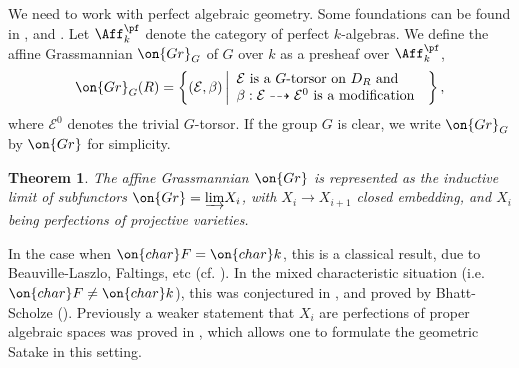\documentclass[11pt]{amsart}
\newtheorem{thm}{Theorem}[subsection]
\theoremstyle{definition}
\theoremstyle{definition}
\theoremstyle{definition}
\numberwithin{equation}{subsection}
\newcommand{\mE}{{\mathcal E}}
\newcommand{\cha}{{\on{char}}}
\newcommand{\Gr}{{\on{Gr}}}
\begin{document}
We need to work with perfect algebraic geometry. Some foundations can be found in \cite[Appendix A]{Zh1}, \cite{BS} and \cite[\S A.1]{XZ}.
Let $\Aff_k^\pf$ denote the category of perfect $k$-algebras. We define the affine Grassmannian $\Gr_G$ of $G$ over $k$ as a presheaf over $\Aff_k^\pf$,
\begin{equation}
\label{E:affGrass def}
\Gr_G(R)= \left\{(\mE,\beta)\left | \begin{array}{l}\mE \mbox{ is a } G\mbox{-torsor on } D_R\textrm{ and }  \\
 \beta: \mE\dashrightarrow \mE^0 \mbox{ is a modification }\end{array}\right.\right\},
\end{equation}
where $\mE^0$ denotes the trivial $G$-torsor. If the group $G$ is clear, we write $\Gr_G$ by $\Gr$ for simplicity.
\begin{thm}\label{affGrass}
The affine Grassmannian $\Gr$ is represented as the inductive limit of subfunctors $\Gr=\underrightarrow\lim X_i$, with $X_i\to X_{i+1}$ closed embedding, and $X_i$ being perfections of projective varieties. 
\end{thm}
In the case when $\cha F=\cha k$, this is a classical result, due to Beauville-Laszlo, Faltings, etc (cf. \cite{BL, Fa}). In the mixed characteristic situation (i.e. $\cha F\neq \cha k$), this was conjectured in \cite[Appendix B]{Zh1}, and proved by Bhatt-Scholze (\cite{BS}). Previously a weaker statement that $X_i$ are perfections of proper algebraic spaces was proved in \cite{Zh1}, which allows one to formulate the geometric Satake in this setting.
\end{document}
